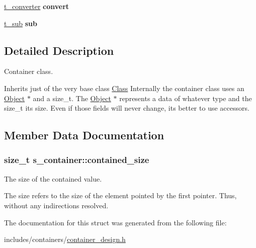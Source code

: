 \begin{DoxyCompactItemize}
\item 
\hyperlink{container__design_8h_aa004f3109740124351709e752a117513}{t\+\_\+converter} {\bfseries convert}\hypertarget{structs__container_adf985c4250876ba5586e9e99101f6abb}{}\label{structs__container_adf985c4250876ba5586e9e99101f6abb}

\item 
\hyperlink{container__design_8h_ae6206d9b391ae392849b532af95cbccc}{t\+\_\+sub} {\bfseries sub}\hypertarget{structs__container_a2af686d0acc5bd382ae53fbd16e8e3e2}{}\label{structs__container_a2af686d0acc5bd382ae53fbd16e8e3e2}

\end{DoxyCompactItemize}


\subsection{Detailed Description}
Container class. 

Inherits just of the very base class \hyperlink{structClass}{Class} Internally the container class uses an {\ttfamily \hyperlink{object_8h_a608d016c3acb8a52cdfb8e21a8fd294e}{Object} $\ast$} and a {\ttfamily size\+\_\+t}. The {\ttfamily \hyperlink{object_8h_a608d016c3acb8a52cdfb8e21a8fd294e}{Object} $\ast$} represents a data of whatever type and the {\ttfamily size\+\_\+t} its size. Even if those fields will never change, it\textquotesingle{}s better to use accessors. 

\subsection{Member Data Documentation}
\subsubsection[{\texorpdfstring{contained\+\_\+size}{contained\_size}}]{\setlength{\rightskip}{0pt plus 5cm}size\+\_\+t s\+\_\+container\+::contained\+\_\+size}\hypertarget{structs__container_a27e071d7cdc230a146fe99ddd4fa8c4a}{}\label{structs__container_a27e071d7cdc230a146fe99ddd4fa8c4a}


The size of the contained value. 

The size refers to the size of the element pointed by the first pointer. Thus, without any indirections resolved. 

The documentation for this struct was generated from the following file\+:\begin{DoxyCompactItemize}
\item 
includes/containers/\hyperlink{container__design_8h}{container\+\_\+design.\+h}\end{DoxyCompactItemize}
